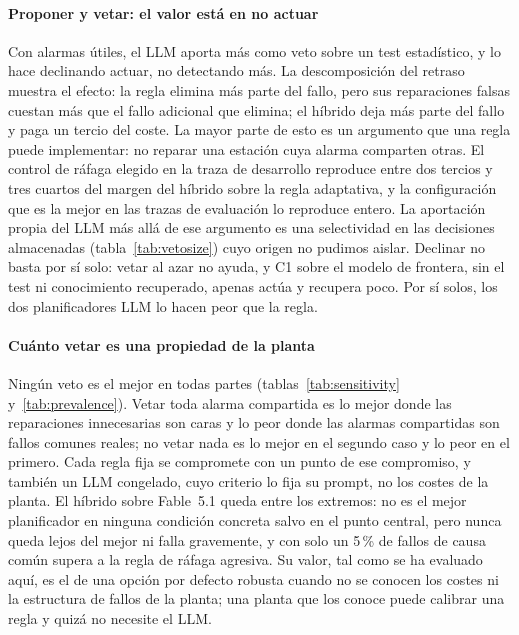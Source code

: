 \documentclass[preprint,11pt]{elsarticle}
\begin{document}
\paragraph{Proponer y vetar: el valor está en no actuar}
Con alarmas útiles, el LLM aporta más como veto sobre un test estadístico, y lo hace declinando actuar, no detectando más. La descomposición del retraso muestra el efecto: la regla elimina más parte del fallo, pero sus reparaciones falsas cuestan más que el fallo adicional que elimina; el híbrido deja más parte del fallo y paga un tercio del coste. La mayor parte de esto es un argumento que una regla puede implementar: no reparar una estación cuya alarma comparten otras. El control de ráfaga elegido en la traza de desarrollo reproduce entre dos tercios y tres cuartos del margen del híbrido sobre la regla adaptativa, y la configuración que es la mejor en las trazas de evaluación lo reproduce entero. La aportación propia del LLM más allá de ese argumento es una selectividad en las decisiones almacenadas (tabla~\ref{tab:vetosize}) cuyo origen no pudimos aislar. Declinar no basta por sí solo: vetar al azar no ayuda, y C1 sobre el modelo de frontera, sin el test ni conocimiento recuperado, apenas actúa y recupera poco. Por sí solos, los dos planificadores LLM lo hacen peor que la regla.

\paragraph{Cuánto vetar es una propiedad de la planta}
Ningún veto es el mejor en todas partes (tablas~\ref{tab:sensitivity} y~\ref{tab:prevalence}). Vetar toda alarma compartida es lo mejor donde las reparaciones innecesarias son caras y lo peor donde las alarmas compartidas son fallos comunes reales; no vetar nada es lo mejor en el segundo caso y lo peor en el primero. Cada regla fija se compromete con un punto de ese compromiso, y también un LLM congelado, cuyo criterio lo fija su prompt, no los costes de la planta. El híbrido sobre Fable~5.1 queda entre los extremos: no es el mejor planificador en ninguna condición concreta salvo en el punto central, pero nunca queda lejos del mejor ni falla gravemente, y con solo un 5\,\% de fallos de causa común supera a la regla de ráfaga agresiva. Su valor, tal como se ha evaluado aquí, es el de una opción por defecto robusta cuando no se conocen los costes ni la estructura de fallos de la planta; una planta que los conoce puede calibrar una regla y quizá no necesite el LLM.
\end{document}
